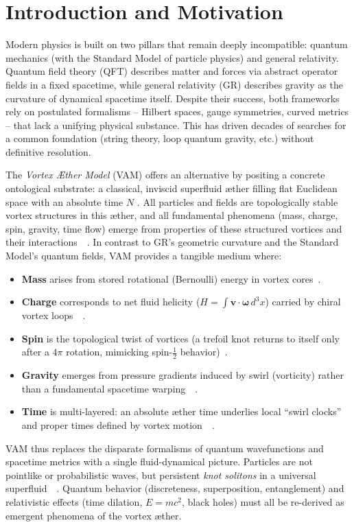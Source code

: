 \documentclass[preprint]{revtex4-2}
\begin{document}
\section{Introduction and Motivation}
    Modern physics is built on two pillars that remain deeply incompatible: quantum mechanics (with the Standard Model of particle physics) and general relativity. Quantum field theory (QFT) describes matter and forces via abstract operator fields in a fixed spacetime, while general relativity (GR) describes gravity as the curvature of dynamical spacetime itself. Despite their success, both frameworks rely on postulated formalisms -- Hilbert spaces, gauge symmetries, curved metrics -- that lack a unifying physical substance. This has driven decades of searches for a common foundation (string theory, loop quantum gravity, etc.) without definitive resolution.

    The \emph{Vortex Æther Model} (VAM) offers an alternative by positing a concrete ontological substrate: a classical, inviscid superfluid æther filling flat Euclidean space with an absolute time $N$ \cite{reference_0}. All particles and fields are topologically stable vortex structures in this æther, and all fundamental phenomena (mass, charge, spin, gravity, time flow) emerge from properties of these structured vortices and their interactions~\cite{reference_0}~\cite{reference_1}. In contrast to GR’s geometric curvature and the Standard Model’s quantum fields, VAM provides a tangible medium where:
    \begin{itemize}
        \item \textbf{Mass} arises from stored rotational (Bernoulli) energy in vortex cores~\cite{reference_2}.
        \item \textbf{Charge} corresponds to net fluid helicity ($H=\int \mathbf{v}\cdot\boldsymbol{\omega}\,d^3x$) carried by chiral vortex loops~\cite{reference_3}~\cite{reference_4}.
        \item \textbf{Spin} is the topological twist of vortices (a trefoil knot returns to itself only after a $4\pi$ rotation, mimicking spin-$\frac{1}{2}$ behavior)~\cite{reference_5}.
        \item \textbf{Gravity} emerges from pressure gradients induced by swirl (vorticity) rather than a fundamental spacetime warping~\cite{reference_6}~\cite{reference_7}.
        \item \textbf{Time} is multi-layered: an absolute æther time underlies local “swirl clocks” and proper times defined by vortex motion~\cite{reference_8}~\cite{reference_9}.
    \end{itemize}
    VAM thus replaces the disparate formalisms of quantum wavefunctions and spacetime metrics with a single fluid-dynamical picture. Particles are not pointlike or probabilistic waves, but persistent \emph{knot solitons} in a universal superfluid~\cite{reference_10}~\cite{reference_11}. Quantum behavior (discreteness, superposition, entanglement) and relativistic effects (time dilation, $E=mc^2$, black holes) must all be re-derived as emergent phenomena of the vortex æther.
\end{document}
